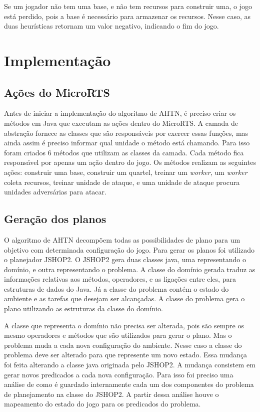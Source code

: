 Se um jogador não tem uma base, e não tem recursos para construir uma, o jogo está perdido, pois a base é necessário para armazenar os recursos. 
Nesse caso, as duas heurísticas retornam um valor negativo, indicando o fim do jogo. 

\section{Implementação}

\subsection{Ações do MicroRTS}

Antes de iniciar a implementação do algoritmo de AHTN, é preciso criar os métodos em Java que executam as ações dentro do MicroRTS.
A camada de abstração fornece as classes que são responsáveis por exercer essas funções, mas ainda assim é preciso informar qual unidade o método está chamando.
Para isso foram criados 6 métodos que utilizam as classes da camada.
Cada método fica responsável por apenas um ação dentro do jogo.
Os métodos realizam as seguintes ações: construir uma base, construir um quartel, treinar um \textit{worker}, um \textit{worker} coleta recursos, treinar unidade de ataque, e uma unidade de ataque procura unidades adversárias para atacar.

\subsection{Geração dos planos}

O algoritmo de AHTN decompõem todas as possibilidades de plano para um objetivo com determinada configuração do jogo.
Para gerar os planos foi utilizado o planejador JSHOP2.
O JSHOP2 gera duas classes java, uma representando o domínio, e outra representando o problema.
A classe do domínio gerada traduz as informações relativas aos métodos, operadores, e as ligações entre eles, para estruturas de dados do Java.
Já a classe do problema contém o estado do ambiente e as tarefas que desejam ser alcançadas.
A classe do problema gera o plano utilizando as estruturas da classe do domínio.

A classe que representa o domínio não precisa ser alterada, pois são sempre os mesmo operadores e métodos que são utilizados para gerar o plano.
Mas o problema muda a cada nova configuração do ambiente.
Nesse caso a classe do problema deve ser alterado para que represente um novo estado.
Essa mudança foi feita alterando a classe java originada pelo JSHOP2. 
A mudança consistem em gerar novos predicados a cada nova configuração.
Para isso foi preciso uma análise de como é guardado internamente cada um dos componentes do problema de planejamento na classe do JSHOP2.
A partir dessa análise houve o mapeamento do estado do jogo para os predicados do problema.

